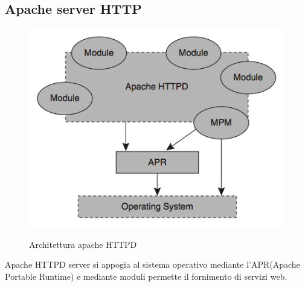 \subsection{Apache server HTTP}
\begin{figure}[h!]
    \centering
    \includegraphics[width=0.5\linewidth]{imgs/3 - apache modules.png}
    \label{fig:apache}
    \caption{Architettura apache HTTPD}
\end{figure}
Apache HTTPD server si appogia al sistema operativo mediante l'APR(Apache Portable Runtime) e mediante moduli permette il fornimento di servizi web.
